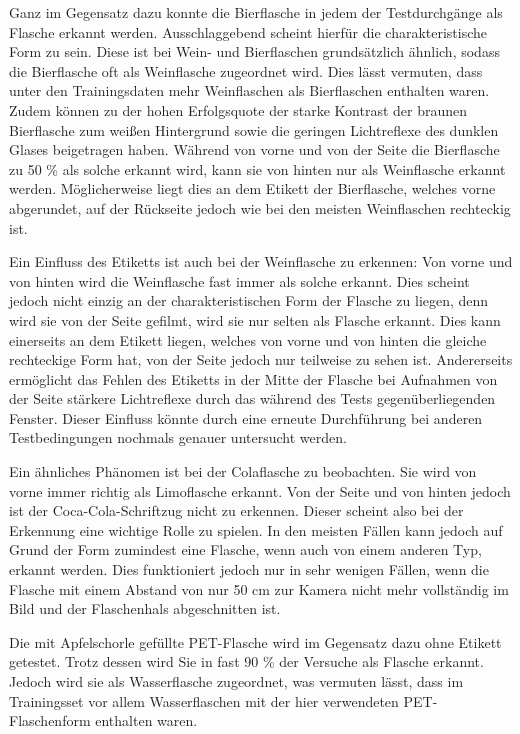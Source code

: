 \bigskip

Ganz im Gegensatz dazu konnte die Bierflasche in jedem der Testdurchgänge als Flasche erkannt werden.
Ausschlaggebend scheint hierfür die charakteristische Form zu sein. Diese ist bei Wein- und Bierflaschen grundsätzlich ähnlich, sodass die Bierflasche oft als Weinflasche zugeordnet wird. 
Dies lässt vermuten, dass unter den Trainingsdaten mehr Weinflaschen als Bierflaschen enthalten waren. 
Zudem können zu der hohen Erfolgsquote der starke Kontrast der braunen Bierflasche zum weißen Hintergrund sowie die geringen Lichtreflexe des dunklen Glases beigetragen haben.
Während von vorne und von der Seite die Bierflasche zu 50 \% als solche erkannt wird, 
kann sie von hinten nur als Weinflasche erkannt werden. Möglicherweise liegt dies an dem Etikett der Bierflasche, welches vorne abgerundet, auf der Rückseite jedoch wie bei den meisten Weinflaschen rechteckig ist.

\bigskip

Ein Einfluss des Etiketts ist auch bei der Weinflasche zu erkennen: 
Von vorne und von hinten wird die Weinflasche fast immer als solche erkannt.
Dies scheint jedoch nicht einzig an der charakteristischen Form der Flasche zu liegen, denn wird sie von der Seite gefilmt, wird sie nur selten als Flasche erkannt.
Dies kann einerseits an dem Etikett liegen, welches von vorne und von hinten die gleiche rechteckige Form hat, von der Seite jedoch nur teilweise zu sehen ist.
Andererseits ermöglicht das Fehlen des Etiketts in der Mitte der Flasche bei Aufnahmen von der Seite stärkere Lichtreflexe durch das während des Tests 
gegenüberliegenden Fenster. 
Dieser Einfluss könnte durch eine erneute Durchführung bei anderen Testbedingungen nochmals genauer untersucht werden.

\bigskip

Ein ähnliches Phänomen ist bei der Colaflasche zu beobachten.
Sie wird von vorne immer richtig als Limoflasche erkannt. Von der Seite und von hinten jedoch ist der Coca-Cola-Schriftzug nicht zu erkennen. Dieser scheint also
bei der Erkennung eine wichtige Rolle zu spielen.
In den meisten Fällen kann jedoch auf Grund der Form zumindest eine Flasche, wenn auch von einem anderen Typ, erkannt werden.
Dies funktioniert jedoch nur in sehr wenigen Fällen, wenn die Flasche mit einem Abstand von nur 50 cm zur Kamera nicht mehr vollständig im Bild und der Flaschenhals abgeschnitten ist.

\bigskip

Die mit Apfelschorle gefüllte PET-Flasche wird im Gegensatz dazu ohne Etikett getestet. Trotz dessen wird Sie in fast 90 \% der Versuche als Flasche erkannt. 
Jedoch wird sie als Wasserflasche zugeordnet, was vermuten lässt, dass im Trainingsset vor allem Wasserflaschen mit der hier verwendeten PET-Flaschenform enthalten waren.

